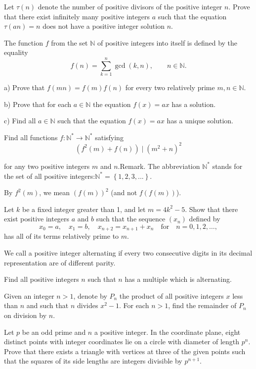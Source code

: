 \item[\textbf{N1.}]Let $\tau(n)$ denote the number of positive divisors of the positive integer $n$. Prove that there exist infinitely many positive integers $a$ such that the equation $ \tau(an)=n $ does not have a positive integer solution $n$.

\item[\textbf{N2.}]The function $f$ from the set $\mathbb{N}$ of positive integers into itself is defined by the equality \[f(n)=\sum_{k=1}^{n} \gcd(k,n),\qquad n\in \mathbb{N}.\]

a) Prove that $f(mn)=f(m)f(n)$ for every two relatively prime ${m,n\in\mathbb{N}}$.

b) Prove that for each $a\in\mathbb{N}$ the equation $f(x)=ax$ has a solution.

c) Find all ${a\in\mathbb{N}}$ such that the equation $f(x)=ax$ has a unique solution.

\item[\textbf{N3.}]Find all functions $ f: \mathbb{N^{*}}\to \mathbb{N^{*}}$ satisfying\[ \left(f^{2}\left(m\right)+f\left(n\right)\right) \mid \left(m^{2}+n\right)^{2}\]

for any two positive integers $ m$ and $ n$.Remark. The abbreviation $ \mathbb{N^{*}}$ stands for the set of all positive integers:$ \mathbb{N^{*}}=\left\{1,2,3,...\right\}$.

By $ f^{2}\left(m\right)$,  we mean $ \left(f\left(m\right)\right)^{2}$ (and not $ f\left(f\left(m\right)\right)$).

\item[\textbf{N4.}]Let $k$ be a fixed integer greater than 1, and let ${m=4k^2-5}$. Show that there exist positive integers $a$ and $b$ such that the sequence $(x_n)$ defined by \[x_0=a,\quad x_1=b,\quad x_{n+2}=x_{n+1}+x_n\quad\text{for}\quad n=0,1,2,\dots,\] has all of its terms relatively prime to $m$.

\item[\textbf{N5.}]We call a positive integer alternating if every two consecutive digits in its decimal representation are of different parity.

Find all positive integers $n$ such that $n$ has a multiple which is alternating.

\item[\textbf{N6.}]Given an integer ${n>1}$,  denote by $P_{n}$ the product of all positive integers $x$ less than $n$ and such that $n$ divides ${x^2-1}$. For each ${n>1}$,  find the remainder of $P_{n}$ on division by $n$.

\item[\textbf{N7.}]Let $p$ be an odd prime and $n$ a positive integer. In the coordinate plane, eight distinct points with integer coordinates lie on a circle with diameter of length $p^{n}$. Prove that there exists a triangle with vertices at three of the given points such that the squares of its side lengths are integers divisible by $p^{n+1}$.

